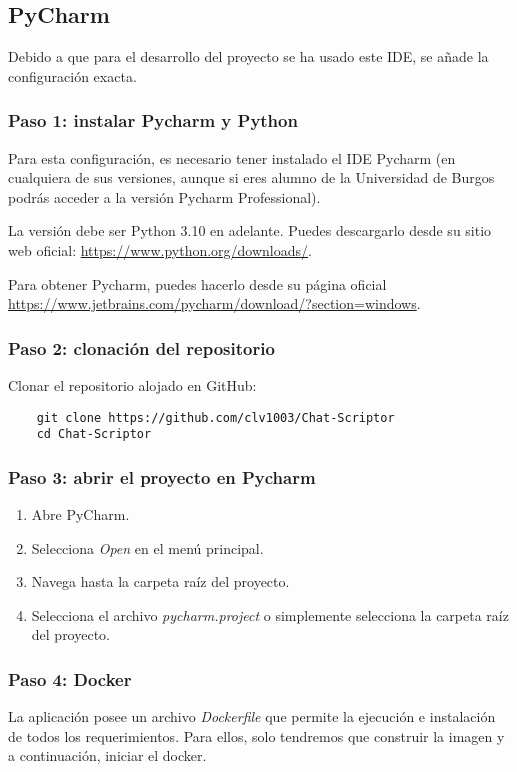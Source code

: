 \subsection{PyCharm}
Debido a que para el desarrollo del proyecto se ha usado este IDE, se añade la configuración exacta.

\subsubsection{Paso 1: instalar Pycharm y Python}
Para esta configuración, es necesario tener instalado el IDE Pycharm (en cualquiera de sus versiones, aunque si eres alumno de la Universidad de Burgos podrás acceder a la versión Pycharm Professional).

La versión debe ser Python 3.10 en adelante. Puedes descargarlo desde su sitio web oficial: \url{https://www.python.org/downloads/}.

Para obtener Pycharm, puedes hacerlo desde su página oficial \url{https://www.jetbrains.com/pycharm/download/?section=windows}.

\subsubsection{Paso 2: clonación del repositorio}
Clonar el repositorio alojado en GitHub:
\begin{verbatim}
    git clone https://github.com/clv1003/Chat-Scriptor
    cd Chat-Scriptor
\end{verbatim}

\subsubsection{Paso 3: abrir el proyecto en Pycharm}
\begin{enumerate}
    \item Abre PyCharm.
    \item Selecciona \textit{Open} en el menú principal.
    \item Navega hasta la carpeta raíz del proyecto.
    \item Selecciona el archivo \textit{pycharm.project} o simplemente selecciona la carpeta raíz del proyecto.
\end{enumerate}

\subsubsection{Paso 4: Docker}
La aplicación posee un archivo \textit{Dockerfile} que permite la ejecución e instalación de todos los requerimientos. Para ellos, solo tendremos que construir la imagen y a continuación, iniciar el docker.

